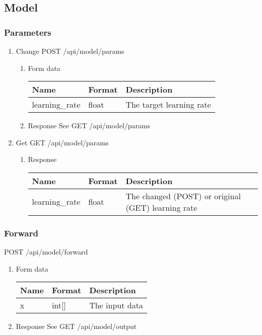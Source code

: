 \documentclass[11pt]{article}
\begin{document}
\subsection{Model}
\label{sec:org1e08338}
\subsubsection{Parameters}
\label{sec:org08a734b}
\begin{enumerate}
\item Change
\label{sec:org207bd47}
POST /api/model/params
\begin{enumerate}
\item Form data
\label{sec:orgbcf20a3}
\begin{center}
\begin{tabular}{lll}
Name & Format & Description\\
\hline
learning\_rate & float & The target learning rate\\
\end{tabular}
\end{center}
\item Response
\label{sec:org39cd272}
See GET /api/model/params
\end{enumerate}

\item Get
\label{sec:org763c23c}
GET /api/model/params
\begin{enumerate}
\item Response
\label{sec:org682b186}
\begin{center}
\begin{tabular}{lll}
Name & Format & Description\\
\hline
learning\_rate & float & The changed (POST) or original (GET) learning rate\\
\end{tabular}
\end{center}
\end{enumerate}
\end{enumerate}
\subsubsection{Forward}
\label{sec:org979a01e}
POST /api/model/forward
\begin{enumerate}
\item Form data
\label{sec:orgfb92061}
\begin{center}
\begin{tabular}{lll}
Name & Format & Description\\
\hline
x & int[] & The input data\\
\end{tabular}
\end{center}
\item Response
\label{sec:org7249e48}
See GET /api/model/output
\end{enumerate}
\end{document}
